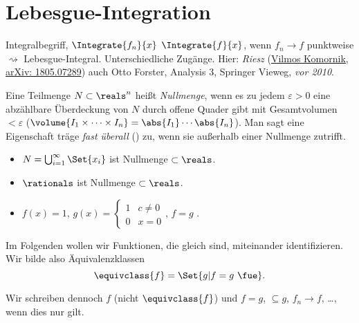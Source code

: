 \chapter{Lebesgue-Integration}
Integralbegriff, \sd \( \Integrate{f_n}{x} \) \tto \( \Integrate{f}{x} \), wenn \( f_n\to f \) punktweise \( \rightsquigarrow \) Lebesgue-Integral. Unterschiedliche Zugänge. Hier: \emph{Riesz} (\href{https://arxiv.org/abs/1805.07289}{Vilmos Komornik, arXiv: 1805.07289}) \vgl auch Otto Forster, Analysis 3, Springer Vieweg, \emph{vor 2010}.

\begin{definition}\label{nullmenge}
  Eine Teilmenge \( N\subset \reals^n \) heißt \emph{Nullmenge}, wenn es zu jedem \( \varepsilon>0 \) eine abzählbare Überdeckung von \( N \) durch offene Quader gibt mit Gesamtvolumen \( <\varepsilon \) (\( \volume{I_1\times \dotsb \times I_n}=\abs{I_1}\dotsm \abs{I_n} \)). Man sagt eine Eigenschaft träge \emph{fast überall} (\fue) zu, wenn sie außerhalb einer Nullmenge zutrifft.
\end{definition}
\begin{beispiele*}
  \begin{itemize}
    \item \( N=\bigcup_{i=1}^{\infty}\Set{x_i} \) ist Nullmenge \( \subset \reals \).
    \item \( \rationals \) ist Nullmenge \( \subset \reals \).
    \item \( f(x)=1 \), \( g(x)=\begin{cases}
      1 & c\neq 0 \\ 0 & x=0
    \end{cases} \), \( f=g \) \fue.
  \end{itemize}
\end{beispiele*}
Im Folgenden wollen wir Funktionen, die \fue gleich sind, miteinander identifizieren. Wir bilde also Äquivalenzklassen
\begin{equation*}
  \equivclass{f}=\Set{g|f=g \text{ \fue}}.
\end{equation*}
\begin{notation*}
  Wir schreiben dennoch \( f \) (nicht \( \equivclass{f} \)) und \( f=g \), \( \subseteq g \), \( f_n\to f \), \dots, wenn dies nur \fue gilt.
\end{notation*}
